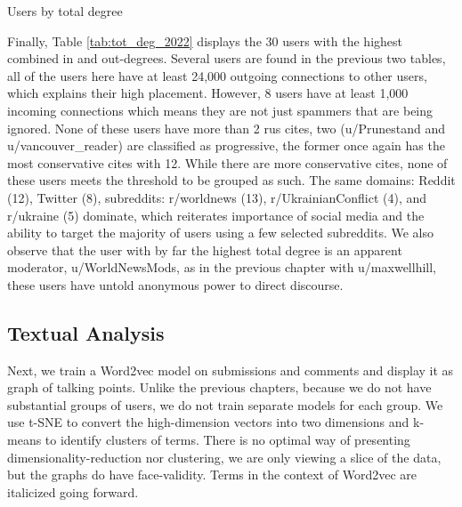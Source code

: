 \documentclass[doublespacing]{utdthesis}
\begin{document}
\begin{table}[!ht]
\centering
\scriptsize
\caption{Users by total degree}

\label{tab:tot_deg_2022}
\end{table}

Finally, Table \ref{tab:tot_deg_2022} displays the 30 users with the highest combined in and out-degrees.
Several users are found in the previous two tables, all of the users here have at least 24,000 outgoing connections to other users, which explains their high placement.
However, 8 users have at least 1,000 incoming connections which means they are not just spammers that are being ignored.
None of these users have more than 2 rus cites, two (u/Prunestand and u/vancouver\_reader) are classified as progressive, the former once again has the most conservative cites with 12.
While there are more conservative cites, none of these users meets the threshold to be grouped as such.
The same domains: Reddit (12), Twitter (8), subreddits: r/worldnews (13), r/UkrainianConflict (4), and r/ukraine (5) dominate, which reiterates importance of social media and the ability to target the majority of users using a few selected subreddits.
We also observe that the user with by far the highest total degree is an apparent moderator, u/WorldNewsMods, as in the previous chapter with u/maxwellhill, these users have untold anonymous power to direct discourse.

\subsection{Textual Analysis}

Next, we train a Word2vec model on submissions and comments and display it as graph of talking points.
Unlike the previous chapters, because we do not have substantial groups of users, we do not train separate models for each group.
We use t-SNE to convert the high-dimension vectors into two dimensions and k-means to identify clusters of terms.
There is no optimal way of presenting dimensionality-reduction nor clustering, we are only viewing a slice of the data, but the graphs do have face-validity.
Terms in the context of Word2vec are italicized going forward. 
\end{document}

